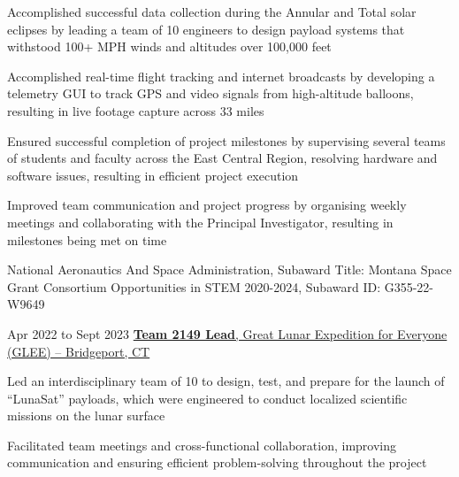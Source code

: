     \vspace{0.15 cm}
    \begin{onecolentry}
        \begin{highlights}
            \item Accomplished successful data collection during the Annular and Total solar eclipses by leading a team of 10 engineers to design payload systems that withstood 100+ MPH winds and altitudes over 100,000 feet
            \item Accomplished real-time flight tracking and internet broadcasts by developing a telemetry GUI to track GPS and video signals from high-altitude balloons, resulting in live footage capture across 33 miles
            \item Ensured successful completion of project milestones by supervising several teams of students and faculty across the East Central Region, resolving hardware and software issues, resulting in efficient project execution
            \item Improved team communication and project progress by organising weekly meetings and collaborating with the Principal Investigator, resulting in milestones being met on time
            \item National Aeronautics And Space Administration, Subaward Title: Montana Space Grant Consortium Opportunities in STEM 2020-2024, Subaward ID: G355-22-W9649
        \end{highlights}
    \end{onecolentry}

    \vspace{0.2 cm}

    \begin{twocolentry}{
        Apr 2022 to Sept 2023
    }
        \href{https://www.glee2023.org}{\textbf{Team 2149 Lead}, Great Lunar Expedition for Everyone (GLEE) -- Bridgeport, CT}
    \end{twocolentry}

    \vspace{0.15 cm}
    \begin{onecolentry}
        \begin{highlights}
          \item Led an interdisciplinary team of 10 to design, test, and prepare for the launch of “LunaSat” payloads, which were engineered to conduct localized scientific missions on the lunar surface
          \item Facilitated team meetings and cross-functional collaboration, improving communication and ensuring efficient problem-solving throughout the project
        \end{highlights}
    \end{onecolentry}